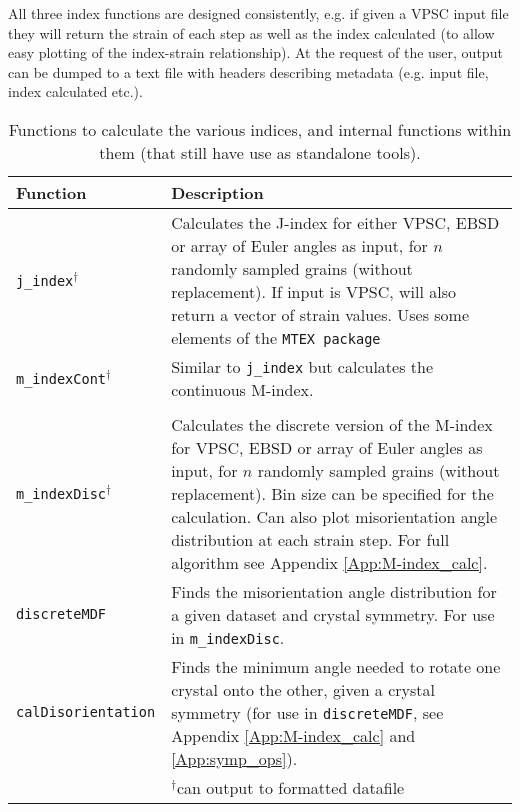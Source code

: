 \documentclass[a4paper,12pt,twoside]{report}
\numberwithin{equation}{chapter}
\begin{document}
All three index functions are designed consistently, e.g. if given a VPSC input file they will return the strain of each step as well as the index calculated (to allow easy plotting of the index-strain relationship). At the request of the user, output can be dumped to a text file with headers describing metadata (e.g. input file, index calculated etc.).                                                                                                                    

\begin{table}[h!] 
	\centering
	\caption[Functions: index calculation]{Functions to calculate the various indices, and internal functions within them (that still have use as standalone tools).}
	\noindent
	
\begin{tabularx}{\textwidth}{lX}

\hline
\hline
Function    & Description   \\ 
\hline
\hline
\texttt{j\_{}index}$^{\dagger}$ & Calculates the J-index for either VPSC, EBSD or array of Euler angles as input, for $n$ randomly sampled grains (without replacement). If input is VPSC, will also return a vector of strain values. Uses some elements of the \texttt{MTEX package} \\ 

\texttt{m\_{}indexCont}$^{\dagger}$ & Similar to \texttt{j\_{}index} but calculates the continuous M-index. \\
\\
\hline

\texttt{m\_{}indexDisc}$^{\dagger}$ & Calculates the discrete version of the M-index for VPSC, EBSD or array of Euler angles as input, for $n$ randomly sampled grains (without replacement). Bin size can be specified for the calculation. Can also plot misorientation angle distribution at each strain step. For full algorithm see Appendix \ref{App:M-index_calc}. \\

\texttt{discreteMDF} & Finds the misorientation angle distribution for a given dataset and crystal symmetry. For use in \texttt{m\_{}indexDisc}. \\

\texttt{calDisorientation} & Finds the minimum angle needed to rotate one crystal onto the other, given a crystal symmetry (for use in \texttt{discreteMDF}, see Appendix \ref{App:M-index_calc} and \ref{App:symp_ops}). \\
\hline
{} & $^\dagger$can output to formatted datafile \\
\hline
\hline
\end{tabularx}
\label{tab:index_functions}
\end{table}
\end{document}
